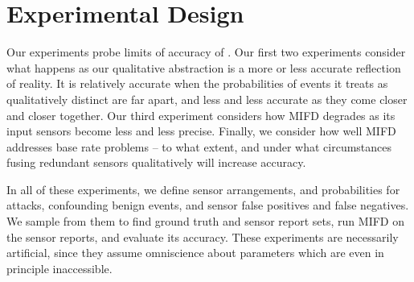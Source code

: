 \section{Experimental Design}
\label{sec:experimental-design}

Our experiments probe limits of accuracy of \zplus.
Our first two experiments consider what happens as our qualitative abstraction
is a more or less accurate reflection of reality.  It is relatively accurate when the
probabilities of events it treats as qualitatively distinct are far apart, and
less and less accurate as they come closer and closer together. 
Our third experiment considers how MIFD degrades as its input sensors become
less and less precise.
Finally, we consider how well MIFD addresses base rate problems -- to what
extent, and under what circumstances fusing redundant sensors qualitatively will
increase accuracy.

In all of these experiments, we define sensor arrangements, and probabilities for attacks, confounding
benign events, and sensor false positives and false negatives. We sample from
them to find ground truth and sensor report sets, run MIFD on the sensor
reports, and evaluate its accuracy.
These experiments are necessarily artificial, since they assume
omniscience about parameters which are even in principle inaccessible.


